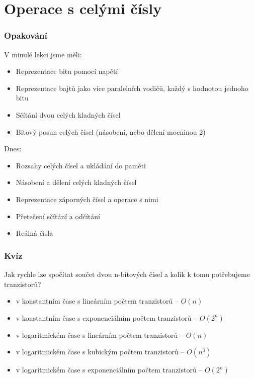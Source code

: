 
\section{Operace s celými čísly}

\begin{frame}
\frametitle{Opakování}
V minulé lekci jsme měli:
\begin{itemize}
\item Reprezentace bitu pomocí napětí
\item Reprezentace bajtů jako více paralelních vodičů, každý s hodnotou jednoho bitu
\item Sčítání dvou celých kladných čísel
\item Bitový posun celých čísel (násobení, nebo dělení mocninou 2)
\end{itemize}

Dnes:
\begin{itemize}
\item Rozsahy celých čísel a ukládání do paměti
\item Násobení a dělení celých kladných čísel 
\item Reprezentace záporných čísel a operace s nimi
\item Přetečení sčítání a odčítání
\item Reálná čísla
\end{itemize}
\end{frame}


\begin{frame}
\frametitle{Kvíz}
Jak rychle lze spočítat součet dvou n-bitových čísel a kolik k tomu potřebujeme tranzistorů?
\begin{itemize}
\item[A] v konstantním čase s lineárním počtem tranzistorů -- $O(n)$
\item[B] v konstantním čase s exponenciálním počtem tranzistorů -- $O(2^n)$
\item[C] v logaritmickém čase s lineárním počtem tranzistorů -- $O(n)$
\item[D] v logaritmickém čase s kubickým počtem tranzistorů -- $O(n^3)$
\item[E] v logaritmickém čase s exponenciálním počtem tranzistorů -- $O(2^n)$
\end{itemize}
\end{frame}


